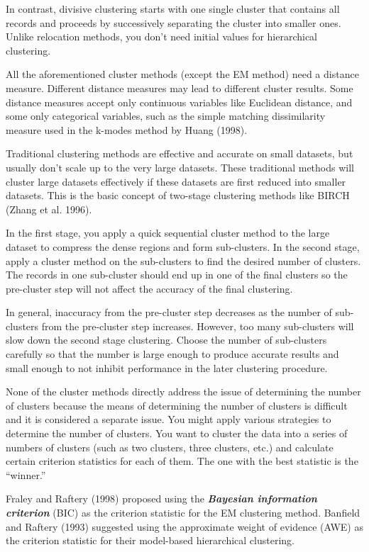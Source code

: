 In contrast, divisive clustering starts with one single cluster that contains all records and proceeds by successively separating the
cluster into smaller ones. Unlike relocation methods, you don’t need initial values for hierarchical clustering.

All the aforementioned cluster methods (except the EM method) need a distance measure. Different distance measures may lead to different cluster results. Some distance
measures accept only continuous variables like Euclidean distance, and some only categorical
variables, such as the simple matching dissimilarity measure used in the k-modes
method by Huang (1998).

Traditional clustering methods are effective and accurate on small datasets, but usually don’t scale up to the very large datasets. These traditional methods will cluster large
datasets effectively if these datasets are first reduced into smaller datasets. This is the basic concept of two-stage clustering methods like BIRCH (Zhang et al. 1996). 

In the first stage, you apply a quick sequential cluster method to the large dataset to compress the
dense regions and form sub-clusters. In the second stage, apply a cluster method on the sub-clusters to find the desired number of clusters. The records in one sub-cluster should
end up in one of the final clusters so the pre-cluster step will not affect the accuracy of the final clustering. 

In general, inaccuracy from the pre-cluster step decreases as the number of sub-clusters from the pre-cluster step increases. However, too many sub-clusters
will slow down the second stage clustering. Choose the number of sub-clusters carefully so that the number is large enough to produce accurate results and small enough to not inhibit performance in the later clustering procedure.

None of the cluster methods directly address the issue of determining the number of
clusters because the means of determining the number of clusters is difficult and it is
considered a separate issue. You might apply various strategies to determine the number
of clusters. You want to cluster the data into a series of numbers of clusters (such as two
clusters, three clusters, etc.) and calculate certain criterion statistics for each of them.
The one with the best statistic is the “winner.” 

Fraley and Raftery (1998) proposed using the \textit{\textbf{Bayesian information criterion}} (BIC) as the criterion statistic for the EM clustering
method. 
Banfield and Raftery (1993) suggested using the approximate weight of evidence (AWE) as the criterion statistic for their model-based hierarchical 
clustering.

